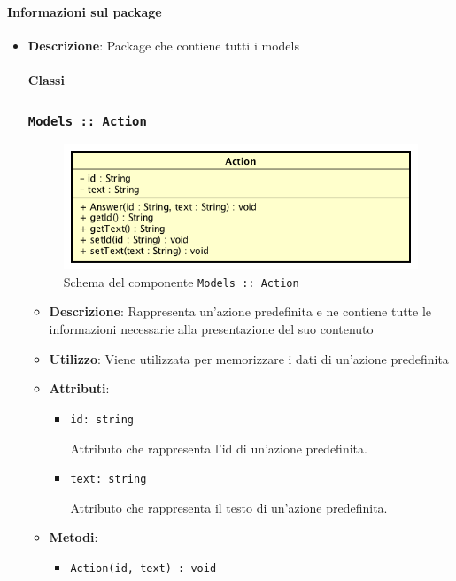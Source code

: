 \documentclass[../DefinizioneDiProdotto.tex]{subfiles}
\begin{document}
\paragraph{Informazioni sul package}\begin{itemize}\item \textbf{Descrizione}: Package che contiene tutti i models\paragraph{Classi}

	\newpage
	\subsubsection{\texttt{Models :: Action}}
	\begin{figure}[!h]
		\centering
		\includegraphics[scale=0.7]{Architettura/Models/Action.png}
		\caption{Schema del componente \texttt{Models :: Action}}
	\end{figure}

	\begin{itemize}\item \textbf{Descrizione}: Rappresenta un'azione predefinita e ne contiene tutte le informazioni necessarie alla presentazione del suo contenuto
	\item \textbf{Utilizzo}: Viene utilizzata per memorizzare i dati di un'azione predefinita
	\item \textbf{Attributi}:
	\begin{itemize}
	\item \texttt{id: string}\

	 Attributo che rappresenta l'id di un'azione predefinita.
	\end{itemize}
	\begin{itemize}
	\item \texttt{text: string}\

	 Attributo che rappresenta il testo di un'azione predefinita.
	\end{itemize}
	\item \textbf{Metodi}:
	\begin{itemize}
	\item \texttt{Action(id, text) : void}\


\end{itemize}
\end{itemize}
\end{itemize}
\end{document}
